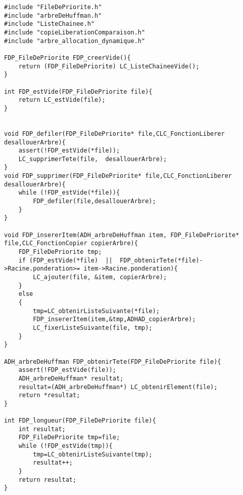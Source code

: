 \begin{verbatim}
#include "FileDePriorite.h"
#include "arbreDeHuffman.h"
#include "ListeChainee.h"
#include "copieLiberationComparaison.h"
#include "arbre_allocation_dynamique.h"

FDP_FileDePriorite FDP_creerVide(){
    return (FDP_FileDePriorite) LC_ListeChaineeVide();
}

int FDP_estVide(FDP_FileDePriorite file){
    return LC_estVide(file);
}


void FDP_defiler(FDP_FileDePriorite* file,CLC_FonctionLiberer desallouerArbre){
    assert(!FDP_estVide(*file));
    LC_supprimerTete(file,  desallouerArbre);
}
void FDP_supprimer(FDP_FileDePriorite* file,CLC_FonctionLiberer desallouerArbre){
	while (!FDP_estVide(*file)){
		FDP_defiler(file,desallouerArbre);
	}
}

void FDP_insererItem(ADH_arbreDeHuffman item, FDP_FileDePriorite* file,CLC_FonctionCopier copierArbre){
    FDP_FileDePriorite tmp;
    if (FDP_estVide(*file)  ||  FDP_obtenirTete(*file)->Racine.ponderation>= item->Racine.ponderation){
        LC_ajouter(file, &item, copierArbre);
    }
    else
    {
        tmp=LC_obtenirListeSuivante(*file);
        FDP_insererItem(item,&tmp,ADHAD_copierArbre);
        LC_fixerListeSuivante(file, tmp);
    }
}

ADH_arbreDeHuffman FDP_obtenirTete(FDP_FileDePriorite file){
    assert(!FDP_estVide(file));
    ADH_arbreDeHuffman* resultat;
    resultat=(ADH_arbreDeHuffman*) LC_obtenirElement(file);
    return *resultat;
}

int FDP_longueur(FDP_FileDePriorite file){
    int resultat;
    FDP_FileDePriorite tmp=file;
    while (!FDP_estVide(tmp)){
        tmp=LC_obtenirListeSuivante(tmp);
        resultat++;
    }
    return resultat;
}

\end{verbatim}
 
